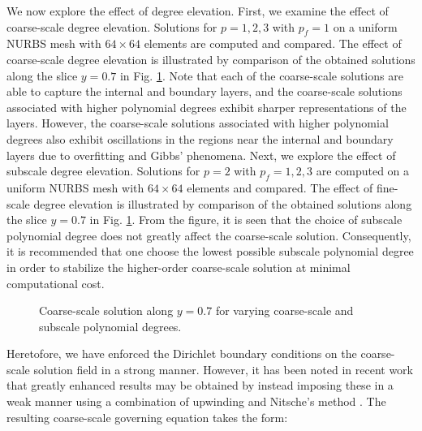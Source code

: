 \documentclass[11pt]{article}
\begin{document}
We now explore the effect of degree elevation.  First, we examine the effect of coarse-scale degree elevation.  Solutions for $p = 1, 2, 3$ with $p_f = 1$ on a uniform NURBS mesh with $64 \times 64$ elements are computed and compared.  The effect of coarse-scale degree elevation is illustrated by comparison of the obtained solutions along the slice $y = 0.7$ in Fig. \ref{fig:skew_slice_degree_elevation}.  Note that each of the coarse-scale solutions are able to capture the internal and boundary layers, and the coarse-scale solutions associated with higher polynomial degrees exhibit sharper representations of the layers.  However, the coarse-scale solutions associated with higher polynomial degrees also exhibit oscillations in the regions near the internal and boundary layers due to overfitting and Gibbs' phenomena.  Next, we explore the effect of subscale degree elevation.  Solutions for $p = 2$ with $p_f = 1, 2, 3$  are computed on a uniform NURBS mesh with $64 \times 64$ elements and compared.  The effect of fine-scale degree elevation is illustrated by comparison of the obtained solutions along the slice $y = 0.7$ in Fig. \ref{fig:skew_slice_degree_elevation}.  From the figure, it is seen that the choice of subscale polynomial degree does not greatly affect the coarse-scale solution.  Consequently, it is recommended that one choose the lowest possible subscale polynomial degree in order to stabilize the higher-order coarse-scale solution at minimal computational cost.

\begin{figure}[ht]
\begin{center}
\caption{Coarse-scale solution along $y = 0.7$ for varying coarse-scale and subscale polynomial degrees.}
\label{fig:skew_slice_degree_elevation}
\end{center}
\end{figure}

Heretofore, we have enforced the Dirichlet boundary conditions on the coarse-scale solution field in a strong manner.  However, it has been noted in recent work that greatly enhanced results may be obtained by instead imposing these in a weak manner using a combination of upwinding and Nitsche's method \cite{Bazilevs07a,Bazilevs07c}.  The resulting coarse-scale governing equation takes the form:\\
\end{document}
